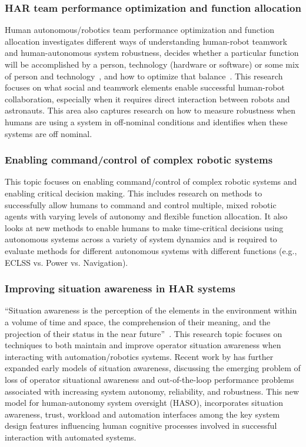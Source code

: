 \subsubsection{HAR team performance optimization and function allocation}
Human autonomous/robotics team performance optimization and function allocation investigates different ways of understanding human-robot teamwork and human-autonomous system robustness, decides whether a particular function will be accomplished by a person, technology (hardware or software) or some mix of person and technology~\citep{fitts_human_1951}, and how to optimize that balance~\citep{yanco_analysis_2015}.
This research focuses on what social and teamwork elements enable successful human-robot collaboration, especially when it requires direct interaction between robots and astronauts.
This area also captures research on how to measure robustness when humans are using a system in off-nominal conditions and identifies when these systems are off nominal.

\subsubsection{Enabling command/control of complex robotic systems}
This topic focuses on enabling command/control of complex robotic systems and enabling critical decision making.
This includes research on methods to successfully allow humans to command and control multiple, mixed robotic agents with varying levels of autonomy and flexible function allocation.
It also looks at new methods to enable humans to make time-critical decisions using autonomous systems across a variety of system dynamics and is required to evaluate methods for different autonomous systems with different functions (e.g., ECLSS vs. Power vs. Navigation).

\subsubsection{Improving situation awareness in HAR systems}
``Situation awareness is the perception of the elements in the environment within a volume of time and space, the comprehension of their meaning, and the projection of their status in the near future''~\citep{endsley2017toward}.
This research topic focuses on techniques to both maintain and improve operator situation awareness when interacting with automation/robotics systems.
Recent work by \citeauthor{endsley_here_2017} has further expanded early models of situation awareness, discussing the emerging problem of loss of operator situational awareness and out-of-the-loop performance problems associated with increasing system autonomy, reliability, and robustness.
This new model for human-autonomy system oversight (HASO), incorporates situation awareness, trust, workload and automation interfaces among the key system design features influencing human cognitive processes involved in successful interaction with automated systems.


